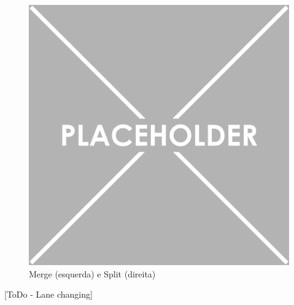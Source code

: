 \begin{figure}[H]
    \centering
    \includegraphics[scale=0.05]{Images/placeholder.png}
    \caption{Merge (esquerda) e Split (direita)}
    \label{fig:my_label}
\end{figure}

[ToDo - Lane changing]